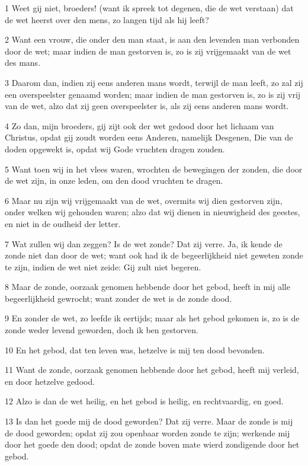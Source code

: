 \par 1 Weet gij niet, broeders! (want ik spreek tot degenen, die de wet verstaan) dat de wet heerst over den mens, zo langen tijd als hij leeft?
\par 2 Want een vrouw, die onder den man staat, is aan den levenden man verbonden door de wet; maar indien de man gestorven is, zo is zij vrijgemaakt van de wet des mans.
\par 3 Daarom dan, indien zij eens anderen mans wordt, terwijl de man leeft, zo zal zij een overspeelster genaamd worden; maar indien de man gestorven is, zo is zij vrij van de wet, alzo dat zij geen overspeelster is, als zij eens anderen mans wordt.
\par 4 Zo dan, mijn broeders, gij zijt ook der wet gedood door het lichaam van Christus, opdat gij zoudt worden eens Anderen, namelijk Desgenen, Die van de doden opgewekt is, opdat wij Gode vruchten dragen zouden.
\par 5 Want toen wij in het vlees waren, wrochten de bewegingen der zonden, die door de wet zijn, in onze leden, om den dood vruchten te dragen.
\par 6 Maar nu zijn wij vrijgemaakt van de wet, overmits wij dien gestorven zijn, onder welken wij gehouden waren; alzo dat wij dienen in nieuwigheid des geestes, en niet in de oudheid der letter.
\par 7 Wat zullen wij dan zeggen? Is de wet zonde? Dat zij verre. Ja, ik kende de zonde niet dan door de wet; want ook had ik de begeerlijkheid niet geweten zonde te zijn, indien de wet niet zeide: Gij zult niet begeren.
\par 8 Maar de zonde, oorzaak genomen hebbende door het gebod, heeft in mij alle begeerlijkheid gewrocht; want zonder de wet is de zonde dood.
\par 9 En zonder de wet, zo leefde ik eertijds; maar als het gebod gekomen is, zo is de zonde weder levend geworden, doch ik ben gestorven.
\par 10 En het gebod, dat ten leven was, hetzelve is mij ten dood bevonden.
\par 11 Want de zonde, oorzaak genomen hebbende door het gebod, heeft mij verleid, en door hetzelve gedood.
\par 12 Alzo is dan de wet heilig, en het gebod is heilig, en rechtvaardig, en goed.
\par 13 Is dan het goede mij de dood geworden? Dat zij verre. Maar de zonde is mij de dood geworden; opdat zij zou openbaar worden zonde te zijn; werkende mij door het goede den dood; opdat de zonde boven mate wierd zondigende door het gebod.
